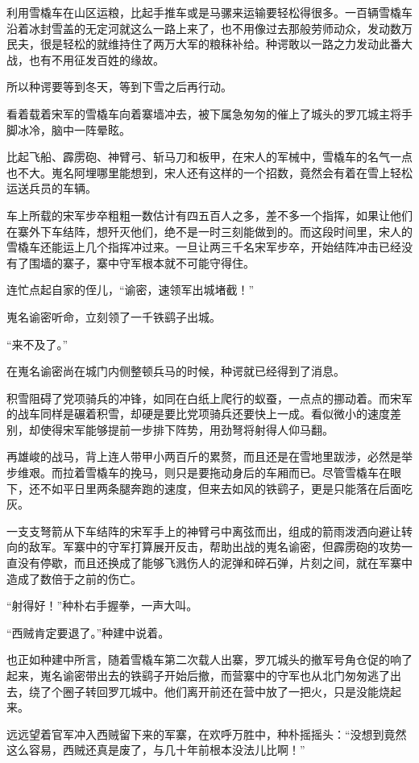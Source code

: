 利用雪橇车在山区运粮，比起手推车或是马骡来运输要轻松得很多。一百辆雪橇车沿着冰封雪盖的无定河就这么一路上来了，也不用像过去那般劳师动众，发动数万民夫，很是轻松的就维持住了两万大军的粮秣补给。种谔敢以一路之力发动此番大战，也有不用征发百姓的缘故。

所以种谔要等到冬天，等到下雪之后再行动。

看着载着宋军的雪橇车向着寨墙冲去，被下属急匆匆的催上了城头的罗兀城主将手脚冰冷，脑中一阵晕眩。

比起飞船、霹雳砲、神臂弓、斩马刀和板甲，在宋人的军械中，雪橇车的名气一点也不大。嵬名阿埋哪里能想到，宋人还有这样的一个招数，竟然会有着在雪上轻松运送兵员的车辆。

车上所载的宋军步卒粗粗一数估计有四五百人之多，差不多一个指挥，如果让他们在寨外下车结阵，想歼灭他们，绝不是一时三刻能做到的。而这段时间里，宋人的雪橇车还能运上几个指挥冲过来。一旦让两三千名宋军步卒，开始结阵冲击已经没有了围墙的寨子，寨中守军根本就不可能守得住。

连忙点起自家的侄儿，“谕密，速领军出城堵截！”

嵬名谕密听命，立刻领了一千铁鹞子出城。

“来不及了。”

在嵬名谕密尚在城门内侧整顿兵马的时候，种谔就已经得到了消息。

积雪阻碍了党项骑兵的冲锋，如同在白纸上爬行的蚁蚕，一点点的挪动着。而宋军的战车同样是碾着积雪，却硬是要比党项骑兵还要快上一成。看似微小的速度差别，却使得宋军能够提前一步排下阵势，用劲弩将射得人仰马翻。

再雄峻的战马，背上连人带甲小两百斤的累赘，而且还是在雪地里跋涉，必然是举步维艰。而拉着雪橇车的挽马，则只是要拖动身后的车厢而已。尽管雪橇车在眼下，还不如平日里两条腿奔跑的速度，但来去如风的铁鹞子，更是只能落在后面吃灰。

一支支弩箭从下车结阵的宋军手上的神臂弓中离弦而出，组成的箭雨泼洒向避让转向的敌军。军寨中的守军打算展开反击，帮助出战的嵬名谕密，但霹雳砲的攻势一直没有停歇，而且还换成了能够飞溅伤人的泥弹和碎石弹，片刻之间，就在军寨中造成了数倍于之前的伤亡。

“射得好！”种朴右手握拳，一声大叫。

“西贼肯定要退了。”种建中说着。

也正如种建中所言，随着雪橇车第二次载人出寨，罗兀城头的撤军号角仓促的响了起来，嵬名谕密带出去的铁鹞子开始后撤，而营寨中的守军也从北门匆匆逃了出去，绕了个圈子转回罗兀城中。他们离开前还在营中放了一把火，只是没能烧起来。

远远望着官军冲入西贼留下来的军寨，在欢呼万胜中，种朴摇摇头：“没想到竟然这么容易，西贼还真是废了，与几十年前根本没法儿比啊！”

